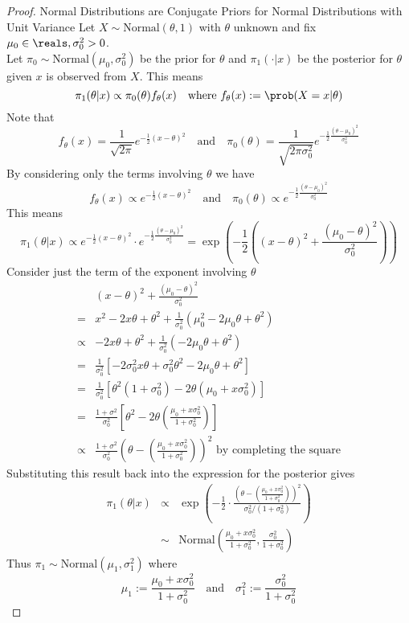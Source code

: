 \documentclass[11pt,a4paper]{article}
\begin{document}
  \begin{proof}{Normal Distributions are Conjugate Priors for Normal Distributions with Unit Variance}
    Let $X\sim\text{Normal}(\theta,1)$ with $\theta$ unknown and fix $\mu_0\in\reals,\sigma^2_0>0$.\\
    Let $\pi_0\sim\text{Normal}(\mu_0,\sigma^2_0)$ be the prior for $\theta$ and $\pi_1(\cdot|x)$ be the posterior for $\theta$ given $x$ is observed from $X$. This means
    \[ \pi_1(\theta|x)\propto\pi_0(\theta)f_\theta(x)\quad\text{where }f_\theta(x):=\prob(X=x|\theta) \]
    Note that
    \[ f_\theta(x)=\frac1{\sqrt{2\pi}}e^{-\frac12(x-\theta)^2}\quad\text{and}\quad\pi_0(\theta)=\frac1{\sqrt{2\pi\sigma^2_0}}e^{-\frac12\frac{(\theta-\mu_0)^2}{\sigma_0^2}} \]
    By considering only the terms involving $\theta$ we have
    \[ f_\theta(x)\propto e^{-\frac12(x-\theta)^2}\quad\text{and}\quad\pi_0(\theta)\propto e^{-\frac12\frac{(\theta-\mu_0)^2}{\sigma_0^2}} \]
    This means
    \[ \pi_1(\theta|x)\propto e^{-\frac12(x-\theta)^2}\cdot e^{-\frac12\frac{(\theta-\mu_0)^2}{\sigma_0^2}}=\exp\left(-\frac12\left((x-\theta)^2+\frac{(\mu_0-\theta)^2}{\sigma_0^2}\right)\right)\]
    Consider just the term of the exponent involving $\theta$
    \[\begin{array}{rl}
      &(x-\theta)^2+\frac{(\mu_0-\theta)^2}{\sigma_0^2}\\
      =&x^2-2x\theta+\theta^2+\frac1{\sigma_0^2}\left(\mu_0^2-2\mu_0\theta+\theta^2\right)\\
      \propto&-2x\theta+\theta^2+\frac1{\sigma_0^2}\left(-2\mu_0\theta+\theta^2\right)\\
      =&\frac1{\sigma_0^2}\left[-2\sigma_0^2x\theta+\sigma_0^2\theta^2-2\mu_0\theta+\theta^2\right]\\
      =&\frac1{\sigma_0^2}\left[\theta^2(1+\sigma^2_0)-2\theta(\mu_0+x\sigma^2_0)\right]\\
      =&\frac{1+\sigma^2}{\sigma_0^2}\left[\theta^2-2\theta\left(\frac{\mu_0+x\sigma^2_0}{1+\sigma^2_0}\right)\right]\\
      \propto&\frac{1+\sigma^2}{\sigma_0^2}\left(\theta-\left(\frac{\mu_0+x\sigma^2_0}{1+\sigma^2_0}\right)\right)^2\text{ by completing the square}
    \end{array}\]
    Substituting this result back into the expression for the posterior gives
    \[\begin{array}{rcl}
    \pi_1(\theta|x)&\propto&\exp\left(-\frac12\cdot\frac{\left(\theta-\left(\frac{\mu_0+x\sigma^2_0}{1+\sigma_0^2}\right)\right)^2}{\sigma_0^2/(1+\sigma_0^2)}\right)\\
    &\sim&\text{Normal}\left(\frac{\mu_0+x\sigma^2_0}{1+\sigma^2_0},\frac{\sigma^2_0}{1+\sigma^2_0}\right)
    \end{array}\]
    Thus $\pi_1\sim\text{Normal}(\mu_1,\sigma_1^2)$ where
    \[ \mu_1:=\frac{\mu_0+x\sigma^2_0}{1+\sigma^2_0}\quad\text{and}\quad\sigma^2_1:=\frac{\sigma^2_0}{1+\sigma^2_0} \]
    \proved
  \end{proof}
\end{document}
